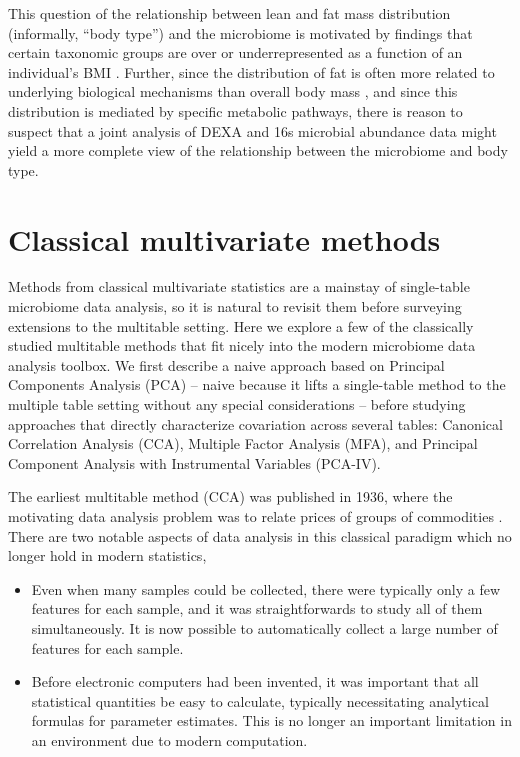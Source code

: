 \documentclass{article}
\begin{document}
This question of the relationship between lean and fat mass distribution
(informally, ``body type'') and the microbiome is motivated by findings that
certain taxonomic groups are over or underrepresented as a function of an
individual's BMI \citep{ley2006microbial, turnbaugh2009core, ley2005obesity,
  ley2010obesity}. Further, since the distribution of fat is often more related
to underlying biological mechanisms than overall body mass
\citep{matsuzawa2008role}, and since this distribution is mediated by specific
metabolic pathways, there is reason to suspect that a joint analysis of DEXA and
16s microbial abundance data might yield a more complete view of the
relationship between the microbiome and body type.

\section{Classical multivariate methods}

Methods from classical multivariate statistics are a mainstay of single-table
microbiome data analysis, so it is natural to revisit them before surveying
extensions to the multitable setting. Here we explore a few of the classically
studied multitable methods that fit nicely into the modern microbiome data
analysis toolbox. We first describe a naive approach based on Principal
Components Analysis (PCA) -- naive because it lifts a single-table method to the
multiple table setting without any special considerations -- before studying
approaches that directly characterize covariation across several tables:
Canonical Correlation Analysis (CCA), Multiple Factor Analysis (MFA), and
Principal Component Analysis with Instrumental Variables (PCA-IV).

The earliest multitable method (CCA) was published in 1936, where the motivating
data analysis problem was to relate prices of groups of commodities
\citep{hotelling1936relations}. There are two notable aspects of data analysis in
this classical paradigm which no longer hold in modern statistics,
\begin{itemize}
  \item Even when many samples could be collected, there were typically only a
    few features for each sample, and it was straightforwards to study all of
    them simultaneously. It is now possible to automatically collect a large
    number of features for each sample.
  \item Before electronic computers had been invented, it was important that all
    statistical quantities be easy to calculate, typically necessitating
    analytical formulas for parameter estimates. This is no longer an important
    limitation in an environment due to modern computation.
\end{itemize}
\end{document}
